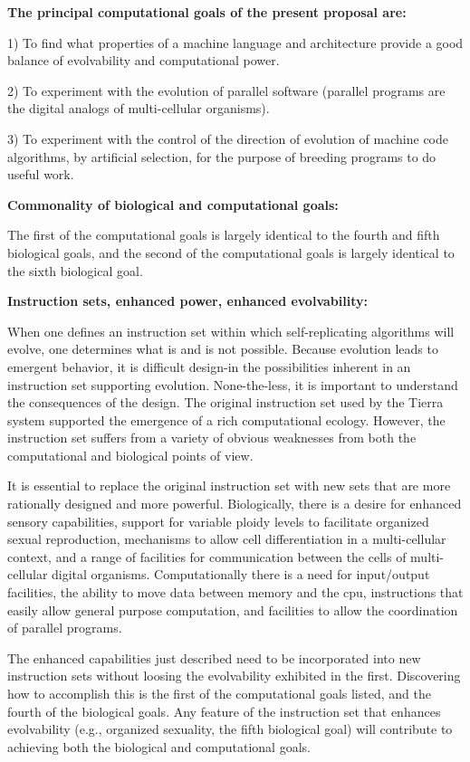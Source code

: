 \XP
{\bf The principal computational goals of the present proposal are:}

1) To find what properties of a machine language and architecture provide
a good balance of evolvability and computational power.

2) To experiment with the evolution of parallel software (parallel
programs are the digital analogs of multi-cellular organisms).

3) To experiment with the control of the direction of evolution of machine
code algorithms, by artificial selection, for the purpose of breeding programs
to do useful work.

{\bf Commonality of biological and computational goals:}
\eXP

The first of the computational goals is largely identical to the fourth
and fifth biological goals, and the second of the computational goals is
largely identical to the sixth biological goal.

{\bf Instruction sets, enhanced power, enhanced evolvability:}

When one defines an instruction set within which self-replicating algorithms
will evolve, one determines what is and is not possible.  Because evolution
leads to emergent behavior, it is difficult design-in the possibilities 
inherent in an instruction set supporting evolution.  None-the-less, it
is important to understand the consequences of the design.  The original
instruction set used by the Tierra system supported the emergence of a rich
computational ecology.  However, the instruction set suffers from a variety
of obvious weaknesses from both the computational and biological points
of view.

It is essential to replace the original instruction set with new sets that
are more rationally designed and more powerful.  Biologically, there is a
desire for enhanced sensory capabilities, support for variable ploidy levels
to facilitate organized sexual reproduction, mechanisms to allow cell
differentiation in a multi-cellular context, and a range of facilities for
communication between the cells of multi-cellular digital organisms.
Computationally there is a need for input/output facilities, the ability to
move data between memory and the cpu, instructions that easily allow general
purpose computation, and facilities to allow the coordination of parallel
programs.

The enhanced capabilities just described need to be incorporated into new
instruction sets without loosing the evolvability exhibited in the first.
Discovering how to accomplish this is the first of the computational goals
listed, and the fourth of the biological goals.  Any feature of the
instruction set that enhances evolvability (e.g., organized sexuality, the
fifth biological goal) will contribute to achieving both the biological
and computational goals.

